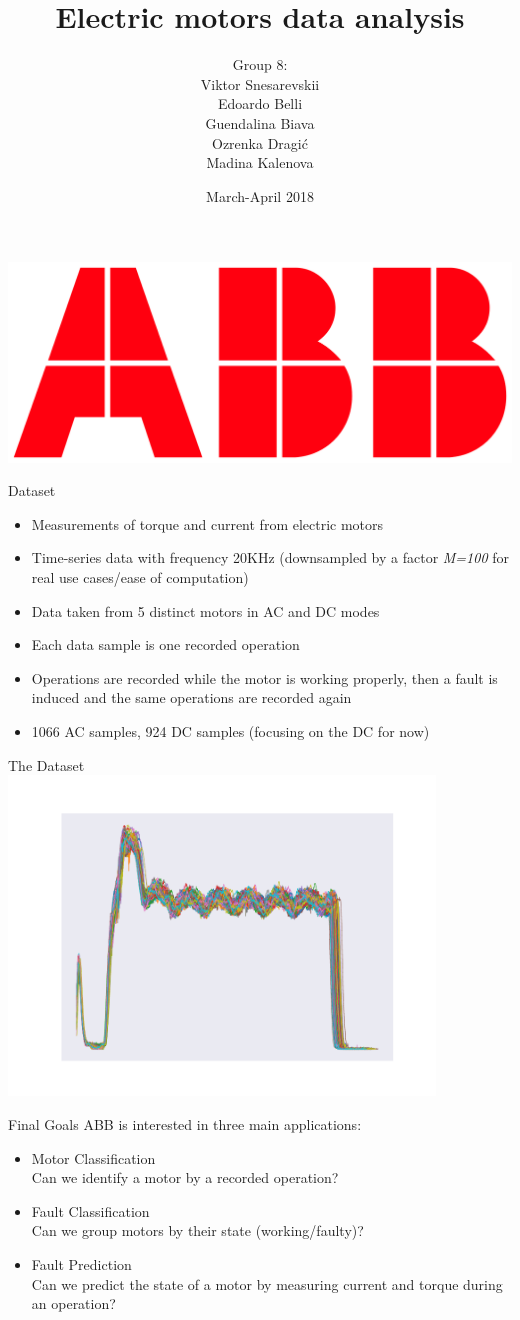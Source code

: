 \documentclass[9pt]{beamer}
\title[Electric motors data analysis]{\huge Electric motors data analysis}
\author[Snesarevskii, Belli, Biava, Dragi\'c, Kalenova] {{\Large Group 8:\\}Viktor Snesarevskii\\Edoardo Belli\\Guendalina Biava\\Ozrenka Dragi\'c\\Madina Kalenova}
\date{March-April 2018}
\begin{document}
	\begin{frame}
	\titlepage
	\vfill
	\begin{flushright}
		\includegraphics[height=.7cm]{abb.png}
	\end{flushright}
\end{frame}

\begin{frame}{Dataset}
\begin{itemize} %
\item Measurements of torque and current from electric motors
\item Time-series data with frequency 20KHz (downsampled by a factor \textit{M=100} for real use cases/ease of computation)
\item Data taken from 5 distinct motors in AC and DC modes
\item Each data sample is one recorded operation
\item Operations are recorded while the motor is working properly, then a fault is induced and the same operations are recorded again 
\item 1066 AC samples, 924 DC samples (focusing on the DC for now)
\end{itemize}
\end{frame}

\begin{frame}{The Dataset}
\centering
\includegraphics[width=0.85\textwidth]{multiplot.pdf}
\end{frame}

\begin{frame}{Final Goals}
ABB is interested in three main applications:
\begin{itemize} %
\item {\large Motor Classification}\\
Can we identify a motor by a recorded operation?
\item {\large Fault Classification}\\
Can we group motors by their state (working/faulty)?
\item {\large Fault Prediction}\\
Can we predict the state of a motor by measuring current and torque during an operation?
\end{itemize}
\end{frame}
\end{document}
